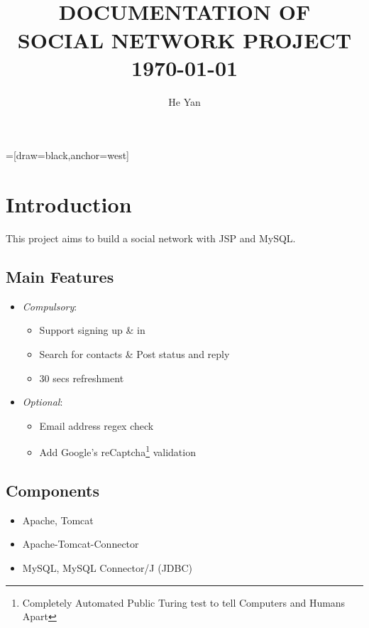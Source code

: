 


=[draw=black,anchor=west]
\title{
        \HRule{2pt}\\
        \LARGE \textbf{\uppercase{Documentation of\\ Social Network Project}}
        \HRule{2pt} \\ [0.5cm]
        \normalsize \today \vspace*{5\baselineskip}}

\date{}

\author{He Yan}

\maketitle
\tableofcontents
\setcounter{page}{0}
\thispagestyle{empty}
\newpage

\section{Introduction}

This project aims to build a social network with JSP and MySQL.

\subsection{Main Features}
\begin{itemize}
	\item \emph{Compulsory}:
		\begin{itemize}
			\item Support signing up \& in
			\item Search for contacts \& Post status and reply
			\item 30 secs refreshment
		\end{itemize}
	\item \emph{Optional}:
		\begin{itemize}
			\item Email address regex check
			\item Add Google's reCaptcha\footnote{Completely Automated Public Turing test to tell Computers and Humans Apart} validation
		\end{itemize}
\end{itemize}

\subsection{Components}
\begin{itemize}
	\item Apache, Tomcat
	\item Apache-Tomcat-Connector
	\item MySQL, MySQL Connector/J (JDBC)
\end{itemize}

